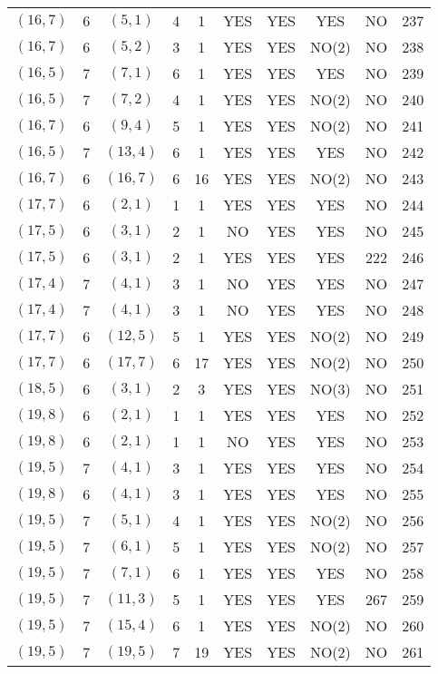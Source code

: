 \begin{longtable}{|c|c|c|c|c|c|c|c|c|c|}
$(16, 7)$ & 6 & $(5, 1)$ & 4 & 1 & YES & YES & YES & NO & 237\\
$(16, 7)$ & 6 & $(5, 2)$ & 3 & 1 & YES & YES & NO(2) & NO & 238\\
$(16, 5)$ & 7 & $(7, 1)$ & 6 & 1 & YES & YES & YES & NO & 239\\
$(16, 5)$ & 7 & $(7, 2)$ & 4 & 1 & YES & YES & NO(2) & NO & 240\\
$(16, 7)$ & 6 & $(9, 4)$ & 5 & 1 & YES & YES & NO(2) & NO & 241\\
$(16, 5)$ & 7 & $(13, 4)$ & 6 & 1 & YES & YES & YES & NO & 242\\
$(16, 7)$ & 6 & $(16, 7)$ & 6 & 16 & YES & YES & NO(2) & NO & 243\\
$(17, 7)$ & 6 & $(2, 1)$ & 1 & 1 & YES & YES & YES & NO & 244\\
$(17, 5)$ & 6 & $(3, 1)$ & 2 & 1 & NO & YES & YES & NO & 245\\
$(17, 5)$ & 6 & $(3, 1)$ & 2 & 1 & YES & YES & YES & 222 & 246\\
$(17, 4)$ & 7 & $(4, 1)$ & 3 & 1 & NO & YES & YES & NO & 247\\
$(17, 4)$ & 7 & $(4, 1)$ & 3 & 1 & NO & YES & YES & NO & 248\\
$(17, 7)$ & 6 & $(12, 5)$ & 5 & 1 & YES & YES & NO(2) & NO & 249\\
$(17, 7)$ & 6 & $(17, 7)$ & 6 & 17 & YES & YES & NO(2) & NO & 250\\
$(18, 5)$ & 6 & $(3, 1)$ & 2 & 3 & YES & YES & NO(3) & NO & 251\\
$(19, 8)$ & 6 & $(2, 1)$ & 1 & 1 & YES & YES & YES & NO & 252\\
$(19, 8)$ & 6 & $(2, 1)$ & 1 & 1 & NO & YES & YES & NO & 253\\
$(19, 5)$ & 7 & $(4, 1)$ & 3 & 1 & YES & YES & YES & NO & 254\\
$(19, 8)$ & 6 & $(4, 1)$ & 3 & 1 & YES & YES & YES & NO & 255\\
$(19, 5)$ & 7 & $(5, 1)$ & 4 & 1 & YES & YES & NO(2) & NO & 256\\
$(19, 5)$ & 7 & $(6, 1)$ & 5 & 1 & YES & YES & NO(2) & NO & 257\\
$(19, 5)$ & 7 & $(7, 1)$ & 6 & 1 & YES & YES & YES & NO & 258\\
$(19, 5)$ & 7 & $(11, 3)$ & 5 & 1 & YES & YES & YES & 267 & 259\\
$(19, 5)$ & 7 & $(15, 4)$ & 6 & 1 & YES & YES & NO(2) & NO & 260\\
$(19, 5)$ & 7 & $(19, 5)$ & 7 & 19 & YES & YES & NO(2) & NO & 261\\

\end{longtable}
